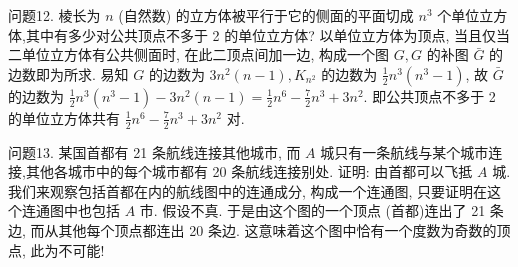 问题12. 棱长为 $n$ (自然数) 的立方体被平行于它的侧面的平面切成 $n^3$ 个单位立方体,其中有多少对公共顶点不多于 2 的单位立方体?
以单位立方体为顶点, 当且仅当二单位立方体有公共侧面时, 在此二顶点间加一边, 构成一个图 $G, G$ 的补图 $\bar{G}$ 的边数即为所求.
易知 $G$ 的边数为 $3 n^2(n-1), K_{n^2}$ 的边数为 $\frac{1}{2} n^3\left(n^3-1\right)$, 故 $\bar{G}$ 的边数为 $\frac{1}{2} n^3\left(n^3-1\right)-3 n^2(n-1)=\frac{1}{2} n^6-\frac{7}{2} n^3+3 n^2$. 即公共顶点不多于 2 的单位立方体共有 $\frac{1}{2} n^6-\frac{7}{2} n^3+3 n^2$ 对.



问题13. 某国首都有 21 条航线连接其他城市, 而 $A$ 城只有一条航线与某个城市连接,其他各城市中的每个城市都有 20 条航线连接别处.
证明: 由首都可以飞抵 $A$ 城.
我们来观察包括首都在内的航线图中的连通成分, 构成一个连通图, 只要证明在这个连通图中也包括 $A$ 市.
假设不真.
于是由这个图的一个顶点 (首都)连出了 21 条边, 而从其他每个顶点都连出 20 条边.
这意味着这个图中恰有一个度数为奇数的顶点, 此为不可能!


